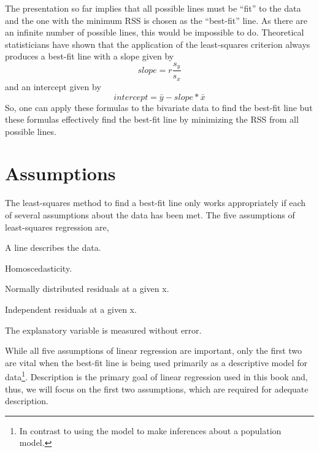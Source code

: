 \documentclass[10pt,openany]{book}\usepackage[]{graphicx}\usepackage[]{color}
\begin{document}
\vspace{-12pt}

The presentation so far implies that all possible lines must be ``fit'' to the data and the one with the minimum RSS is chosen as the ``best-fit'' line.  As there are an infinite number of possible lines, this would be impossible to do.  Theoretical statisticians have shown that the application of the least-squares criterion always produces a best-fit line with a slope given by
  \[ slope = r\frac{s_{y}}{s_{x}}  \]
and an intercept given by
  \[ intercept = \bar{y}-slope*\bar{x}   \]
So, one can apply these formulas to the bivariate data to find the best-fit line but these formulas effectively find the best-fit line by minimizing the RSS from all possible lines.


\section{Assumptions}\label{sect:RegAssumptions}
The least-squares method to find a best-fit line only works appropriately if each of several assumptions about the data has been met.  The five assumptions of least-squares regression are,

\begin{Enumerate}
  \item A line describes the data.
  \item Homoscedasticity.
  \item Normally distributed residuals at a given x.
  \item Independent residuals at a given x.
  \item The explanatory variable is measured without error.
\end{Enumerate}

While all five assumptions of linear regression are important, only the first two are vital when the best-fit line is being used primarily as a descriptive model for data\footnote{In contrast to using the model to make inferences about a population model.}.  Description is the primary goal of linear regression used in this book and, thus, we will focus on the first two assumptions, which are required for adequate description.
\end{document}
